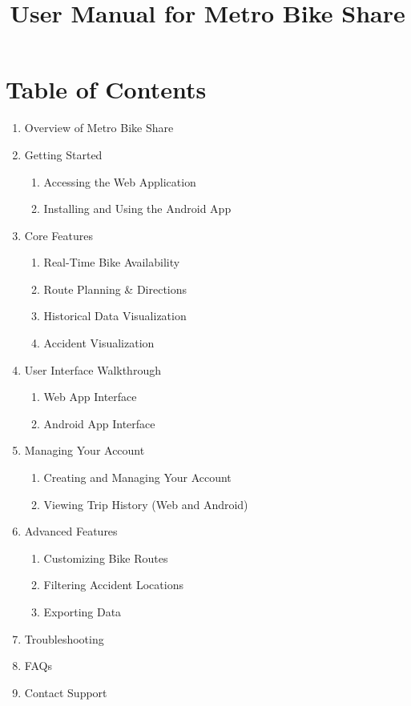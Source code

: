\documentclass[12pt]{article}
\title{User Manual for Metro Bike Share}
\author{}
\date{}
\begin{document}
\maketitle

\section*{Table of Contents}
\begin{enumerate}
    \item Overview of Metro Bike Share
    \item Getting Started
    \begin{enumerate}
        \item Accessing the Web Application
        \item Installing and Using the Android App
    \end{enumerate}
    \item Core Features
    \begin{enumerate}
        \item Real-Time Bike Availability
        \item Route Planning \& Directions
        \item Historical Data Visualization
        \item Accident Visualization
    \end{enumerate}
    \item User Interface Walkthrough
    \begin{enumerate}
        \item Web App Interface
        \item Android App Interface
    \end{enumerate}
    \item Managing Your Account
    \begin{enumerate}
        \item Creating and Managing Your Account
        \item Viewing Trip History (Web and Android)
    \end{enumerate}
    \item Advanced Features
    \begin{enumerate}
        \item Customizing Bike Routes
        \item Filtering Accident Locations
        \item Exporting Data
    \end{enumerate}
    \item Troubleshooting
    \item FAQs
    \item Contact Support
\end{enumerate}
\end{document}
